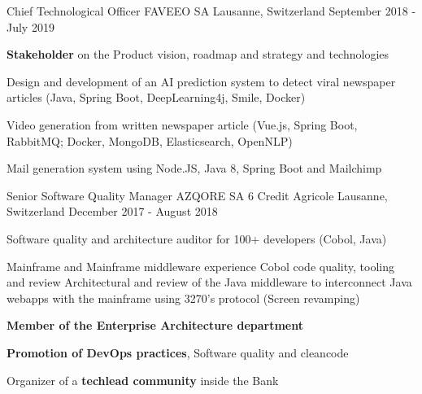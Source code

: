 \begin{cventries}
    \cventry
    {Chief Technological Officer} %
    {FAVEEO SA} %
    {Lausanne, Switzerland} %
    {September 2018 - July 2019} %
    {
        \begin{cvitems} %
            \item{\textbf{Stakeholder} on the Product vision, roadmap and strategy and technologies}
            \item{Design and development of an AI prediction system to detect viral newspaper articles (Java, Spring Boot, DeepLearning4j, Smile, Docker)}
            \item{Video generation from written newspaper article (Vue.js, Spring Boot, RabbitMQ; Docker, MongoDB, Elasticsearch, OpenNLP)}
            \item{Mail generation system using Node.JS, Java 8, Spring Boot and Mailchimp}
        \end{cvitems}
    }

    \cventry
    {Senior Software Quality Manager} %
    {AZQORE SA 6 Credit Agricole} %
    {Lausanne, Switzerland} %
    {December 2017 - August 2018} %
    {
        \begin{cvitems} %
            \item{Software quality and architecture auditor for 100+ developers (Cobol, Java)}
            \item {Mainframe and Mainframe middleware experience}
            \subitem Cobol code quality, tooling and review
            \subitem Architectural and review of the Java middleware to interconnect Java webapps with the mainframe using 3270's protocol (Screen revamping)
            \item{\textbf{Member of the Enterprise Architecture department}}
            \item {\textbf{Promotion of DevOps practices}, Software quality and cleancode}
            \item {Organizer of a \textbf{techlead community }inside the Bank}
        \end{cvitems}
    }


\end{cventries}
